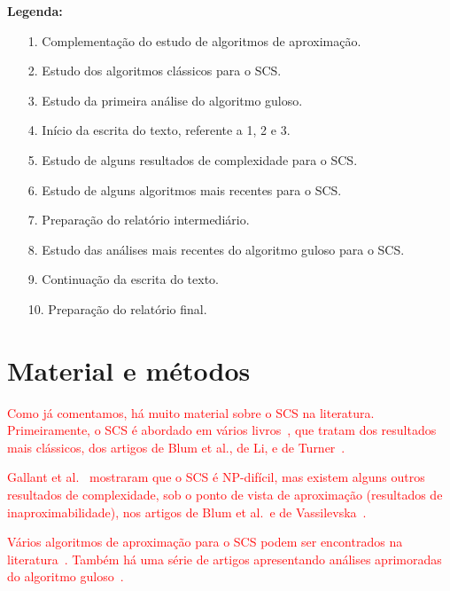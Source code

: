 \documentclass[12pt]{article}
\begin{document}
\noindent 
{\bf Legenda:}

\begin{enumerate}
\item[1.] Complementação do estudo de algoritmos de aproximação. \vspace{-2mm}
\item[2.] Estudo dos algoritmos clássicos para o SCS. \vspace{-2mm}
\item[3.] Estudo da primeira análise do algoritmo guloso. \vspace{-2mm}
\item[4.] Início da escrita do texto, referente a 1, 2 e 3. \vspace{-2mm}
\item[5.] Estudo de alguns resultados de complexidade para o SCS.\vspace{-2mm}
\item[6.] Estudo de alguns algoritmos mais recentes para o SCS. \vspace{-2mm}
\item[7.] Preparação do relatório intermediário. \vspace{-2mm}
\item[8.] Estudo das análises mais recentes do algoritmo guloso para o SCS. \vspace{-2mm}
\item[9.] Continuação da escrita do texto. \vspace{-2mm}
\item[10.] Preparação do relatório final.
\end{enumerate}

\section{Material e métodos}

\textcolor{red}{
Como já comentamos, há muito material sobre o SCS na literatura.
Primeiramente, o SCS é abordado em vários
livros~\cite{Gusfield97,SetubalM97,Vazirani01}, que tratam dos
resultados mais clássicos, dos artigos de Blum et al., de Li, e de
Turner~\cite{BlumJLTY94,Li90,Turner89}.
}

\textcolor{red}{
Gallant et al.~\cite{GallantMS80} mostraram que o SCS é NP-difícil,
mas existem alguns outros resultados de complexidade, sob o ponto de
vista de aproximação (resultados de inaproximabilidade), nos artigos
de Blum et al.~e de Vassilevska~\cite{BlumJLTY94,Vassilevska05}.
}

\textcolor{red}{
Vários algoritmos de aproximação para o SCS podem ser encontrados na
literatura~\cite{ArmenS95a,ArmenS98,Bongartz01,CzumajGPR97,KosarajuPS94,Li90,Sweedyk00}.
Também há uma série de artigos apresentando análises aprimoradas do
algoritmo guloso~\cite{ArmenS95,KaplanS05,WeinardS06}.
}
\end{document}
